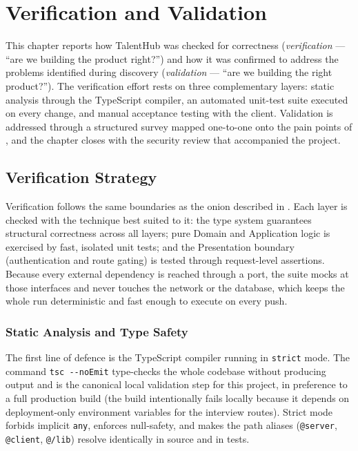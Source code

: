 ﻿\chapter{Verification and Validation}
\label{cap:validation}

This chapter reports how TalentHub was checked for correctness
(\textit{verification} --- ``are we building the product right?'') and how
it was confirmed to address the problems identified during discovery
(\textit{validation} --- ``are we building the right product?''). The
verification effort rests on three complementary layers: static analysis
through the TypeScript compiler, an automated unit-test suite executed on
every change, and manual acceptance testing with the client. Validation is
addressed through a structured survey mapped one-to-one onto the pain points
of , and the chapter closes with the security
review that accompanied the project.


\section{Verification Strategy}
\label{sec:val-verification}

Verification follows the same boundaries as the \gls{onion} described in
. Each layer is checked with the technique best
suited to it: the type system guarantees structural correctness across all
layers; pure Domain and Application logic is exercised by fast, isolated
unit tests; and the Presentation boundary (authentication and route gating)
is tested through request-level assertions. Because every external
dependency is reached through a port, the suite mocks at those interfaces
and never touches the network or the database, which keeps the whole run
deterministic and fast enough to execute on every push.

\subsection{Static Analysis and Type Safety}
\label{sec:val-static}

The first line of defence is the TypeScript compiler running in
\texttt{strict} mode. The command \texttt{tsc -{}-noEmit} type-checks the
whole codebase without producing output and is the canonical local
validation step for this project, in preference to a full production build
(the build intentionally fails locally because it depends on
deployment-only environment variables for the interview routes). Strict
mode forbids implicit \texttt{any}, enforces null-safety, and makes the
path aliases (\texttt{@server}, \texttt{@client}, \texttt{@/lib}) resolve
identically in source and in tests.


